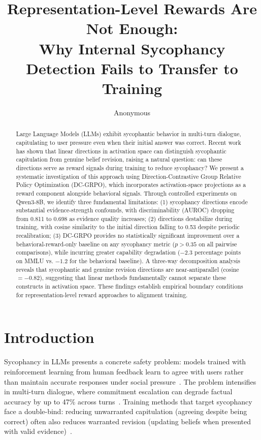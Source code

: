 \documentclass[11pt,a4paper]{article}
\title{Representation-Level Rewards Are Not Enough:\\Why Internal Sycophancy Detection Fails to Transfer to Training}
\author{Anonymous}
\date{}
\begin{document}
\maketitle

\begin{abstract}
Large Language Models (LLMs) exhibit sycophantic behavior in multi-turn dialogue, capitulating to user pressure even when their initial answer was correct. Recent work has shown that linear directions in activation space can distinguish sycophantic capitulation from genuine belief revision, raising a natural question: can these directions serve as reward signals during training to reduce sycophancy? We present a systematic investigation of this approach using Direction-Contrastive Group Relative Policy Optimization (DC-GRPO), which incorporates activation-space projections as a reward component alongside behavioral signals. Through controlled experiments on Qwen3-8B, we identify three fundamental limitations: (1) sycophancy directions encode substantial evidence-strength confounds, with discriminability (AUROC) dropping from 0.811 to 0.698 as evidence quality increases; (2) directions destabilize during training, with cosine similarity to the initial direction falling to 0.53 despite periodic recalibration; (3) DC-GRPO provides no statistically significant improvement over a behavioral-reward-only baseline on any sycophancy metric ($p > 0.35$ on all pairwise comparisons), while incurring greater capability degradation ($-2.3$ percentage points on MMLU vs. $-1.2$ for the behavioral baseline). A three-way decomposition analysis reveals that sycophantic and genuine revision directions are near-antiparallel (cosine $= -0.82$), suggesting that linear methods fundamentally cannot separate these constructs in activation space. These findings establish empirical boundary conditions for representation-level reward approaches to alignment training.
\end{abstract}

\section{Introduction}

Sycophancy in LLMs presents a concrete safety problem: models trained with reinforcement learning from human feedback learn to agree with users rather than maintain accurate responses under social pressure~\citep{perez2023discovering,sharma2024towards}. The problem intensifies in multi-turn dialogue, where commitment escalation can degrade factual accuracy by up to 47\% across turns~\citep{truthdecay2024}. Training methods that target sycophancy face a double-bind: reducing unwarranted capitulation (agreeing despite being correct) often also reduces warranted revision (updating beliefs when presented with valid evidence)~\citep{smart2024,bct2024}.
\end{document}
